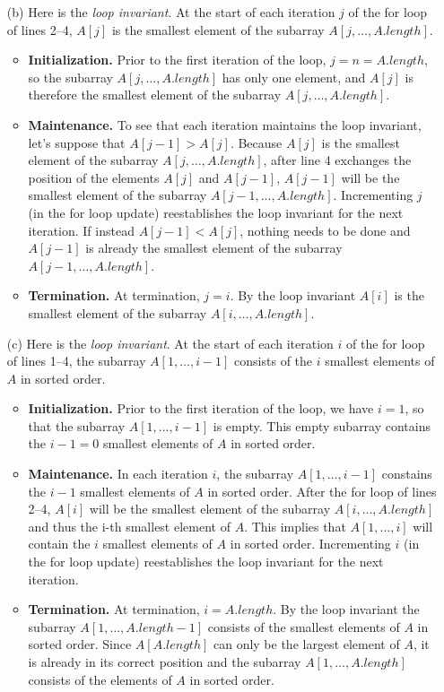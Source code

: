 \documentclass{report}
\makeatletter
\renewenvironment{framed}{%
 \def\FrameCommand##1{\hskip\@totalleftmargin
 \fboxsep=\FrameSep\fbox{##1}}%
 \MakeFramed {\advance\hsize-\width
   \@totalleftmargin\z@ \linewidth\hsize
   \@setminipage}}%
 {\par\unskip\endMakeFramed}
\makeatother
\begin{document}
\begin{enumerate}
\begin{framed}
\begin{enumerate}
\item[(b)] Here is the \emph{loop invariant}. At the start of each iteration $j$
  of the for loop of lines 2{--}4, $A[j]$ is the smallest element of the subarray
$A[j, \dots, A.length]$.
\begin{itemize}
  \item \textbf{Initialization.} Prior to the first iteration of the loop, $j
    = n = A.length$, so the subarray $A[j, \dots, A.length]$ has only one
    element, and $A[j]$ is therefore the smallest element of the subarray $A[j,
    \dots, A.length]$.
  \item \textbf{Maintenance.} To see that each iteration maintains the loop
    invariant, let's suppose that $A[j - 1] > A[j]$. Because $A[j]$ is the
    smallest element of the subarray $A[j, \dots, A.length]$, after line
    4 exchanges the position of the elements $A[j]$ and $A[j - 1]$, $A[j - 1]$
    will be the smallest element of the subarray $A[j - 1, \dots, A.length]$.
    Incrementing $j$ (in the for loop update) reestablishes the loop invariant
    for the next iteration. If instead $A[j - 1] < A[j]$, nothing needs to be
    done and $A[j - 1]$ is already the smallest element of the subarray $A[j
    - 1, \dots, A.length]$.
  \item \textbf{Termination.} At termination, $j = i$. By the loop invariant
    $A[i]$ is the smallest element of the subarray $A[i, \dots, A.length]$.
\end{itemize}

\item[(c)] Here is the \emph{loop invariant}. At the start of each iteration $i$
of the for loop of lines 1{--}4, the subarray $A[1, \dots, i - 1]$ consists of
the $i$ smallest elements of $A$ in sorted order.
\begin{itemize}
  \item \textbf{Initialization.} Prior to the first iteration of the loop, we
    have $i = 1$, so that the subarray $A[1, \dots, i - 1]$ is empty. This empty
    subarray contains the $i - 1 = 0$ smallest elements of $A$ in sorted order.
  \item \textbf{Maintenance.} In each iteration $i$, the subarray $A[1, \dots,
    i - 1]$ constains the $i - 1$ smallest elements of $A$ in sorted order.
    After the for loop of lines 2{--}4, $A[i]$ will be the smallest element of
    the subarray $A[i, \dots, A.length]$ and thus the i-th smallest element of
    $A$. This implies that $A[1, \dots, i]$ will contain the $i$ smallest
    elements of $A$ in sorted order. Incrementing $i$ (in the for loop update)
    reestablishes the loop invariant for the next iteration.
  \item \textbf{Termination.} At termination, $i = A.length$. By the loop
    invariant the subarray $A[1, \dots, A.length - 1]$ consists of the smallest
    elements of $A$ in sorted order. Since $A[A.length]$ can only be the largest
    element of $A$, it is already in its correct position and the subarray $A[1,
    \dots, A.length]$ consists of the elements of $A$ in sorted order.
\end{itemize}


\end{enumerate}
\end{framed}
\end{enumerate}
\end{document}
